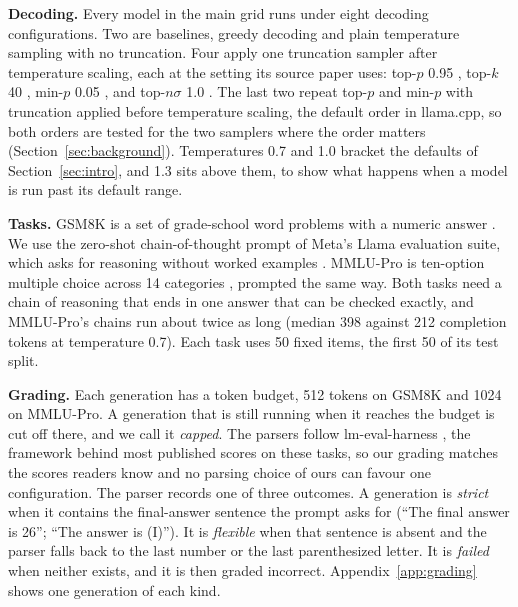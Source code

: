 \documentclass[10pt]{article}
\begin{document}
\begin{table}[t]\centering
\caption{The six runs, 232,700 graded generations in total. Every run uses both tasks with the
same 50 fixed items each and three repetitions of every sampled configuration (one for greedy
decoding), except the stratified subset, which uses 50 fresh MMLU-Pro items. ``8''
configurations are the eight described under Decoding. The main grid also includes a
16-bit GGUF run of Qwen3-4B beside its four quantized runs.}
\label{tab:design}
\footnotesize\setlength{\tabcolsep}{4pt}
\end{table}

\textbf{Decoding.} Every model in the main grid runs under eight decoding configurations. Two
are baselines, greedy decoding and plain temperature sampling with no truncation. Four apply
one truncation sampler after temperature scaling, each at the setting its source paper uses:
top-$p$ 0.95 \citep{holtzman2020curious}, top-$k$ 40 \citep{radford2019gpt2}, min-$p$ 0.05
\citep{nguyen2024minp}, and top-$n\sigma$ 1.0 \citep{tang2024topn}. The last two repeat top-$p$
and min-$p$ with truncation applied before temperature scaling, the default order in llama.cpp,
so both orders are tested for the two samplers where the order matters
(Section~\ref{sec:background}). Temperatures 0.7 and 1.0 bracket the defaults of
Section~\ref{sec:intro}, and 1.3 sits above them, to show what happens when a model is run past
its default range.

\textbf{Tasks.} GSM8K is a set of grade-school word problems with a numeric answer
\citep{cobbe2021gsm8k}. We use the zero-shot chain-of-thought prompt of Meta's Llama evaluation
suite, which asks for reasoning without worked examples \citep{meta2024llamaevals}. MMLU-Pro is
ten-option multiple choice across 14 categories \citep{wang2024mmlupro}, prompted the same way.
Both tasks need a chain of reasoning that ends in one answer that can be checked exactly, and
MMLU-Pro's chains run about twice as long (median 398 against 212 completion tokens at
temperature 0.7). Each task uses 50 fixed items, the first 50 of its test split.

\textbf{Grading.} Each generation has a token budget, 512 tokens on GSM8K and 1024 on MMLU-Pro.
A generation that is still running when it reaches the budget is cut off there, and we call it
\emph{capped}. The parsers follow lm-eval-harness \citep{gao2023evalharness}, the framework
behind most published scores on these tasks, so our grading matches the scores readers know and
no parsing choice of ours can favour one configuration. The parser records one of three
outcomes. A generation is \emph{strict} when it contains the final-answer sentence the prompt
asks for (``The final answer is 26''; ``The answer is (I)''). It is \emph{flexible} when that
sentence is absent and the parser falls back to the last number or the last parenthesized
letter. It is \emph{failed} when neither exists, and it is then graded incorrect.
Appendix~\ref{app:grading} shows one generation of each kind.
\end{document}
